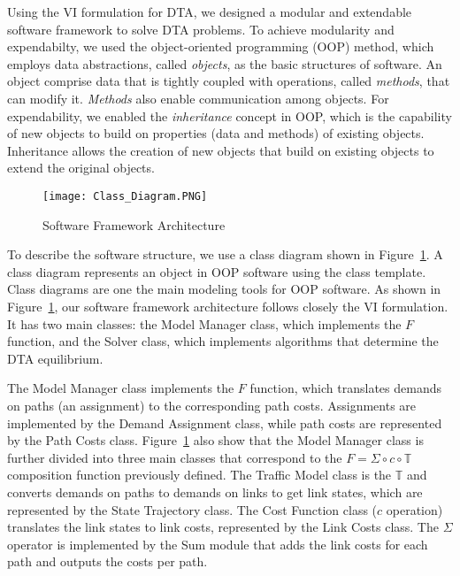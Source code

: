 Using the VI formulation for DTA, we designed a modular and extendable software framework to solve DTA problems. To achieve modularity and expendabilty, we used the object-oriented programming (OOP) method, which employs data abstractions, called \textit{objects}, as the basic structures of software. An object comprise data that is tightly coupled with operations, called \textit{methods}, that can modify it. \textit{Methods} also enable communication among objects. For expendability, we enabled the \textit{inheritance} concept in OOP, which is the capability of new objects to build on properties (data and methods) of existing objects. Inheritance allows the creation of new objects that build on existing objects to extend the original objects\cite{ten1989object}.

\begin{figure}[h]
    \centering
    \texttt{[image: Class\_Diagram.PNG]}
    \caption{Software Framework Architecture}
    \label{fig:class_diagram}
\end{figure}

To describe the software structure, we use a class diagram shown in  Figure~\ref{fig:class_diagram}. A class diagram represents an object in OOP software using the class template. Class diagrams are one the main modeling tools for OOP software. As shown in Figure~\ref{fig:class_diagram}, our software framework architecture follows closely the VI formulation. It has two main classes: the Model Manager class, which implements the $F$ function, and the Solver class, which implements algorithms that determine the DTA equilibrium. 

The Model Manager class implements the $F$ function, which translates demands on paths (an assignment) to the corresponding path costs. Assignments are implemented by the Demand Assignment class, while path costs are represented by the Path Costs class. Figure~\ref{fig:class_diagram} also show that the Model Manager class is further divided into three main classes that correspond to the $F = \Sigma\circ c \circ \mathbb{T}$ composition function previously defined. The Traffic Model class is the $\mathbb{T}$ and converts demands on paths to demands on links to get link states, which are represented by the State Trajectory class. The Cost Function class  ($c$ operation) translates the link states to link costs, represented by the Link Costs class. The $\Sigma$ operator is implemented by the Sum module that adds the link costs for each path and outputs the costs per path. 

